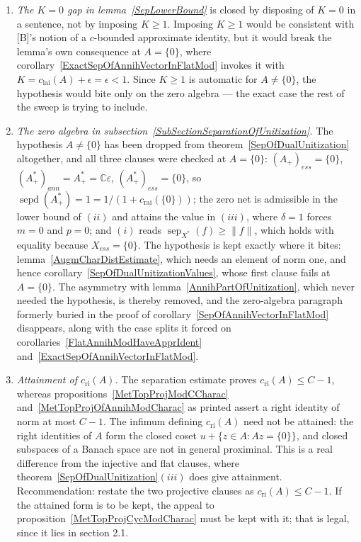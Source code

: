 \documentclass[11pt]{article}
\theoremstyle{plain}
\theoremstyle{definition}
\DeclareMathOperator{\sep}{sep}
\DeclareMathOperator{\sepd}{sepd}
\newcommand{\cri}{c_{\mathrm{ri}}}
\newcommand{\crai}{c_{\mathrm{rai}}}
\newcommand{\clai}{c_{\mathrm{lai}}}
\begin{document}
\begin{enumerate}[label = (\alph*)]
\item \emph{The $K=0$ gap in lemma~\ref{SepLowerBound}} is closed by disposing of
$K=0$ in a sentence, not by imposing $K\geq 1$. Imposing $K\geq 1$ would be
consistent with [B]'s notion of a $c$-bounded approximate identity, but it would
break the lemma's own consequence at $A= \{0 \}$, where
corollary~\ref{ExactSepOfAnnihVectorInFlatMod} invokes it with
$K=\clai(A)+\epsilon=\epsilon<1$. Since $K\geq 1$ is automatic for
$A\neq \{0 \}$, the hypothesis would bite only on the zero algebra --- the exact
case the rest of the sweep is trying to include.

\item \emph{The zero algebra in
subsection~\ref{SubSectionSeparationOfUnitization}.} The hypothesis
$A\neq \{0 \}$ has been dropped from theorem~\ref{SepOfDualUnitization}
altogether, and all three clauses were checked at $A= \{0 \}$:
${(A_+)}_{ess}= \{0 \}$, ${(A_+^*)}_{ann}=A_+^*=\mathbb{C}\varepsilon$,
${(A_+^*)}_{ess}= \{0 \}$, so $\sepd(A_+^*)=1=1/(1+\crai( \{0 \}))$; the zero net
is admissible in the lower bound of $(ii)$ and attains the value in $(iii)$,
where $\delta=1$ forces $m=0$ and $p=0$; and $(i)$ reads
$\sep_{X^*}(f)\geq\lVert f\rVert$, which holds with equality because
$X_{ess}= \{0 \}$. The hypothesis is kept exactly where it bites:
lemma~\ref{AugmCharDistEstimate}, which needs an element of norm one, and hence
corollary~\ref{SepOfDualUnitizationValues}, whose first clause fails at
$A= \{0 \}$. The asymmetry with lemma~\ref{AnnihPartOfUnitization}, which never
needed the hypothesis, is thereby removed, and the zero-algebra paragraph
formerly buried in the proof of
corollary~\ref{SepOfAnnihVectorInFlatMod} disappears, along with the case splits
it forced on corollaries~\ref{FlatAnnihModHaveApprIdent}
and~\ref{ExactSepOfAnnihVectorInFlatMod}.

\item \emph{Attainment of $\cri(A)$.} The separation estimate proves
$\cri(A)\leq C-1$, whereas propositions~\ref{MetTopProjModCCharac}
and~\ref{MetTopProjOfAnnihModCharac} as printed assert a right identity of norm
at most $C-1$. The infimum defining $\cri(A)$ need not be attained: the right
identities of $A$ form the closed coset $u+ \{z\in A:Az= \{0 \} \}$, and closed
subspaces of a Banach space are not in general proximinal. This is a real
difference from the injective and flat clauses, where
theorem~\ref{SepOfDualUnitization}$(iii)$ does give attainment. Recommendation:
restate the two projective clauses as $\cri(A)\leq C-1$. If the attained form is
to be kept, the appeal to proposition~\ref{MetTopProjCycModCharac} must be kept
with it; that is legal, since it lies in section 2.1.


\end{enumerate}
\end{document}
